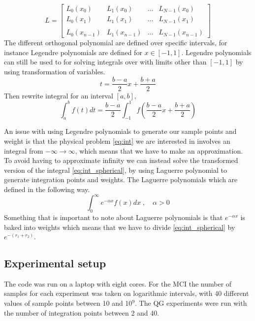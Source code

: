 \begin{equation}\label{eq:ort_matrix}
  L = \begin{bmatrix}
    L_0(x_0) & L_1(x_0) & \dots & L_{N-1}(x_{0}) \\
    L_0(x_1) & L_1(x_1) & \dots & L_{N-1}(x_{1}) \\
    \\
    L_0(x_{n-1}) & L_1(x_{n-1}) & \dots & L_{N-1}(x_{n-1})
  \end{bmatrix}
\end{equation}
The different orthogonal polynomial are defined over specific intervals, for
instance Legendre polynomials are defined for $x \in [-1, 1]$. Legendre
polynomials can still be used to for solving integrals over with limits other
than $[-1,1]$ by using transformation of variables.
\begin{equation}
  t = \frac{b-a}{2}x + \frac{b+a}{2}
\end{equation}
Then rewrite integral for an interval $[a,b]$,
\begin{equation}
  \int_a^b f(t)dt = \frac{b-a}{2}\int_{-1}^{1} f\left(\frac{b-a}{2}x + \frac{b+a}{2}\right)
\end{equation}

An issue with using Legendre polynomials to generate our sample points and
weight is that the physical problem \cref{eq:int} we are interested in involves an
integral from $-\infty \to \infty$, which means that we have to make an
approximation. To avoid having to approximate infinity we can instead solve the
transformed version of the integral \cref{eq:int_spherical}, by using Laguerre
polynomial to generate integration points and weights. The Laguerre polynomials
which are defined in the following way.
\begin{equation}\label{eq:laguerre}
  \int_0^{\infty} e^{-\alpha x} f(x)dx \; , \quad \alpha > 0
\end{equation}
Something that is important to note about Laguerre polynomials is that
$e^{-\alpha x}$ is baked into weights which means that we have to divide
\cref{eq:int_spherical} by $e^{-(r_1 + r_2)}$.



\subsection{Experimental setup}

The code was run on a laptop with eight cores. For the MCI the number of samples
for each experiment was taken on logarithmic intervals, with 40 different values
of sample points between 10 and 10$^9$. The QG experiments were run with the number
of integration points between 2 and 40.
